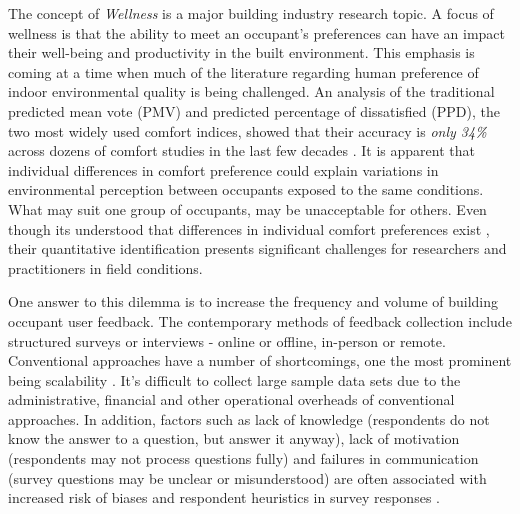 

The concept of \emph{Wellness} is a major building industry research topic. A focus of wellness is that the ability to meet an occupant's preferences can have an impact their well-being and productivity in the built environment. This emphasis is coming at a time when much of the literature regarding human preference of indoor environmental quality is being challenged. An analysis of the traditional predicted mean vote (PMV) and predicted percentage of dissatisfied (PPD), the two most widely used comfort indices, showed that their accuracy is \emph{only 34\%} across dozens of comfort studies in the last few decades \cite{cheung2019analysis, livcina2018development}. It is apparent that individual differences in comfort preference could explain variations in environmental perception between occupants exposed to the same conditions. What may suit one group of occupants, may be unacceptable for others. Even though its understood that differences in individual comfort preferences exist \cite{WANG2018181}, their quantitative identification presents significant challenges for researchers and practitioners in field conditions. 

One answer to this dilemma is to increase the frequency and volume of building occupant user feedback. The contemporary methods of feedback collection include structured surveys or interviews - online or offline, in-person or remote. Conventional approaches have a number of shortcomings, one the most prominent being scalability \cite{oecd}. It's difficult to collect large sample data sets due to the administrative, financial and other operational overheads of conventional approaches. In addition, factors such as lack of knowledge (respondents do not know the answer to a question, but answer it anyway), lack of motivation (respondents may not process questions fully) and failures in communication (survey questions may be unclear or misunderstood) are often associated with increased risk of biases and respondent heuristics in survey responses \cite{bradburn2004asking}. 

